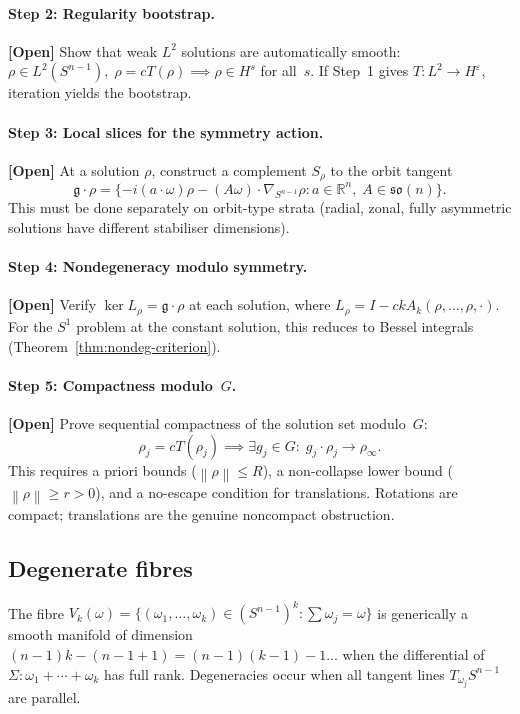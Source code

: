 \documentclass[12pt]{article}
\theoremstyle{definition}
\theoremstyle{remark}
\newcommand{\R}{\mathbb{R}}
\newcommand{\norm}[1]{\left\|#1\right\|}
\newcommand{\open}{\textbf{\color{red}[Open]}}
\begin{document}
\paragraph{Step 2: Regularity bootstrap.}  \open\quad
Show that weak $L^2$ solutions are automatically smooth:
$\rho\in L^2(S^{n-1}),\;\rho=cT(\rho)\implies\rho\in H^s$ for all~$s$.
If Step~1 gives $T:L^2\to H^\varepsilon$, iteration yields the bootstrap.

\paragraph{Step 3: Local slices for the symmetry action.}  \open\quad
At a solution $\rho$, construct a complement $S_\rho$ to the orbit tangent
\[
  \mathfrak g\cdot\rho
  = \{-i(a\cdot\omega)\rho-(A\omega)\cdot\nabla_{S^{n-1}}\rho:
  a\in\R^n,\;A\in\mathfrak{so}(n)\}.
\]
This must be done separately on orbit-type strata (radial, zonal, fully
asymmetric solutions have different stabiliser dimensions).

\paragraph{Step 4: Nondegeneracy modulo symmetry.}  \open\quad
Verify $\ker L_\rho=\mathfrak g\cdot\rho$ at each solution, where
$L_\rho=I-ckA_k(\rho,\ldots,\rho,\cdot)$.  For the $S^1$ problem at
the constant solution, this reduces to Bessel integrals
(Theorem~\ref{thm:nondeg-criterion}).

\paragraph{Step 5: Compactness modulo~$G$.}  \open\quad
Prove sequential compactness of the solution set modulo~$G$:
\[
  \rho_j=cT(\rho_j)\implies\exists g_j\in G:\;g_j\cdot\rho_j\to\rho_\infty.
\]
This requires a priori bounds ($\norm\rho\leq R$), a non-collapse lower
bound ($\norm\rho\geq r>0$), and a no-escape condition for translations.
Rotations are compact; translations are the genuine noncompact obstruction.

\subsection{Degenerate fibres}
\label{sec:degenerate-fibres}

The fibre $V_k(\omega)=\{(\omega_1,\ldots,\omega_k)\in(S^{n-1})^k:
\sum\omega_j=\omega\}$ is generically a smooth manifold of dimension
$(n-1)k-(n-1+1)=(n-1)(k-1)-1$... when the differential of
$\Sigma:\omega_1+\cdots+\omega_k$ has full rank.  Degeneracies occur when
all tangent lines $T_{\omega_j}S^{n-1}$ are parallel.
\end{document}
